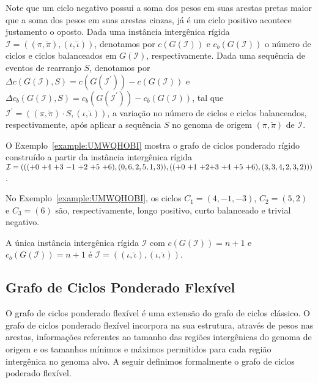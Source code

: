 Note que um ciclo negativo possui a soma dos pesos em suas arestas pretas maior que a soma dos pesos em suas arestas cinzas, já é um ciclo positivo acontece justamento o oposto. Dada uma instância intergênica rígida $\mathcal{I} = ((\pi,\breve\pi),(\iota,\breve\iota))$, denotamos por $c(G(\mathcal{I}))$ e $c_b(G(\mathcal{I}))$ o número de ciclos e ciclos balanceados em $G(\mathcal{I})$, respectivamente. Dada uma sequência de eventos de rearranjo $S$, denotamos por $\Delta c(G(\mathcal{I}), S) = c(G(\mathcal{I^{\prime}})) - c(G(\mathcal{I}))$ e $\Delta c_b(G(\mathcal{I}), S) = c_b(G(\mathcal{I^{\prime}})) - c_b(G(\mathcal{I}))$, tal que $\mathcal{I^{\prime}} = ((\pi,\breve\pi) \cdot S,(\iota,\breve\iota))$, a variação no número de ciclos e ciclos balanceados, respectivamente, após aplicar a sequência $S$ no genoma de origem $(\pi,\breve\pi)$ de $\mathcal{I}$.

O Exemplo~\ref{example:UMWQHOBI} mostra o grafo de ciclos ponderado rígido construído a partir da instância intergênica rígida $\mathcal{I} = ((({+0}~{+4}~{+3}~{-1}~{+2}~{+5}~{+6}),(0,6,2,5,1,3)),(({+0}~{+1}~{+2}\break{+3}~{+4}~{+5}~{+6}),(3,3,4,2,3,2)))$.



No Exemplo~\ref{example:UMWQHOBI}, os ciclos $C_1=(4,-1,-3)$, $C_2 = (5,2)$ e $C_3 = (6)$ são, respectivamente, longo positivo, curto balanceado e trivial negativo.

\begin{remark}\label{remark:WVLFPRDL}
  A única instância intergênica rígida $\mathcal{I}$ com $c(G(\mathcal{I})) = n + 1$ e $c_b(G(\mathcal{I})) = n + 1$ é $\mathcal{I} = ((\iota,\breve\iota),(\iota,\breve\iota))$.
\end{remark}

\subsection{Grafo de Ciclos Ponderado Flexível}

O grafo de ciclos ponderado flexível é uma extensão do grafo de ciclos clássico. O grafo de ciclos ponderado flexível incorpora na sua estrutura, através de pesos nas arestas, informações referentes ao tamanho das regiões intergênicas do genoma de origem e os tamanhos mínimos e máximos permitidos para cada região intergênica no genoma alvo. A seguir definimos formalmente o grafo de ciclos poderado flexível.

